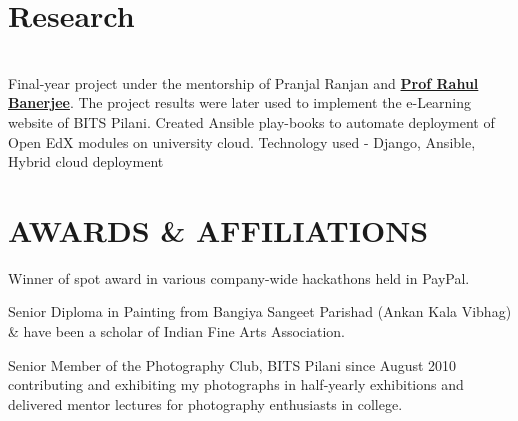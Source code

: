 \documentclass[]{deedy-resume-openfont}
\begin{document}
\begin{minipage}[t]{0.66\textwidth}

\section{Research}
\vspace{\topsep}
 \\
Final-year project under the mentorship of Pranjal Ranjan and \textbf{\href{http://www.cs.cornell.edu/~asaxena/}{Prof Rahul Banerjee}}. 
The project results were later used to implement the e-Learning website of BITS Pilani.
Created Ansible play-books to automate deployment of Open EdX modules on university cloud. Technology used - Django, Ansible, Hybrid cloud deployment
\sectionsep



\section{AWARDS \& AFFILIATIONS} 
\begin{tightemize}\vspace{\topsep}
\item Winner of spot award in various company-wide hackathons held in PayPal.
\item Senior Diploma in Painting from Bangiya Sangeet Parishad (Ankan Kala Vibhag) \& have been a scholar of Indian Fine Arts Association.
\item Senior Member of the Photography Club, BITS Pilani since August 2010 contributing and exhibiting my photographs in half-yearly exhibitions and delivered mentor lectures for photography enthusiasts in college.
\end{tightemize}
\sectionsep

\end{minipage} 
\end{document}
